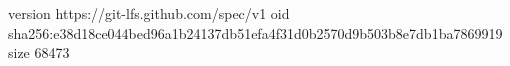 version https://git-lfs.github.com/spec/v1
oid sha256:e38d18ce044bed96a1b24137db51efa4f31d0b2570d9b503b8e7db1ba7869919
size 68473
